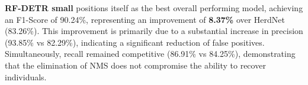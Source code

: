 %
%
%

\textbf{RF-DETR small} positions itself as the best overall performing model, achieving an F1-Score of 90.24\%, representing an improvement of \textbf{8.37\%} over HerdNet (83.26\%). This improvement is primarily due to a substantial increase in precision (93.85\% vs 82.29\%), indicating a significant reduction of false positives. Simultaneously, recall remained competitive (86.91\% vs 84.25\%), demonstrating that the elimination of NMS does not compromise the ability to recover individuals.

